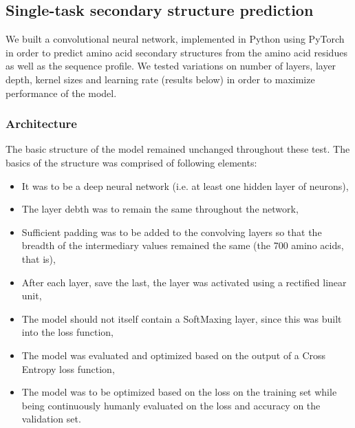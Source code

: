 \begin{multicols}{2}
\subsection{Single-task secondary structure prediction}
We built a convolutional neural network, implemented in Python using PyTorch in order to predict amino acid secondary structures from the amino acid residues as well as the sequence profile. We tested variations on number of layers, layer depth, kernel sizes and learning rate (results below) in order to maximize performance of the model. 

\subsubsection{Architecture}

The basic structure of the model remained unchanged throughout these test. The basics of the structure was comprised of following elements:
\begin{itemize}
\item It was to be a deep neural network (i.e. at least one hidden layer of neurons),
\item The layer debth was to remain the same throughout the network,
\item Sufficient padding was to be added to the convolving layers so that the breadth of the intermediary values remained the same (the 700 amino acids, that is),
\item After each layer, save the last, the layer was activated using a rectified linear unit,
\item The model should not itself contain a SoftMaxing layer, since this was built into the loss function,
\item The model was evaluated and optimized based on the output of a Cross Entropy loss function,
\item The model was to be optimized based on the loss on the training set while being continuously humanly evaluated on the loss and accuracy on the validation set.
\end{itemize}


\end{multicols}
